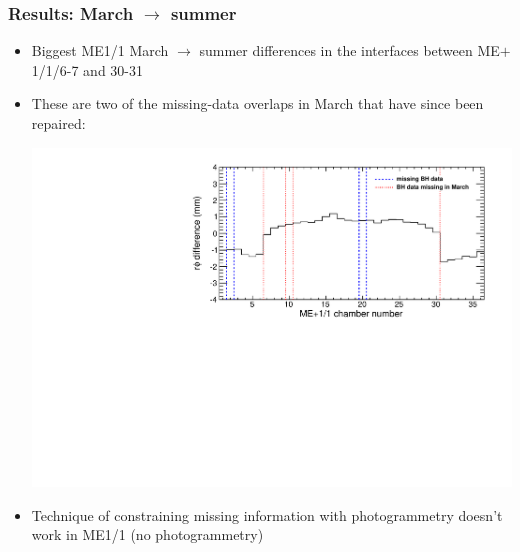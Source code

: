 \documentclass[compress]{beamer}
\begin{document}
\begin{frame}
\frametitle{Results: March $\to$ summer}

\begin{itemize}
\item Biggest ME1/1 March $\to$ summer differences in the interfaces between ME$+$1/1/6-7 and 30-31
\item These are two of the missing-data overlaps in March that have since been repaired:

\includegraphics[width=\linewidth]{TCTtoCollisions_mep11.pdf}

\item Technique of constraining missing information with
  photogrammetry doesn't work in ME1/1 (no photogrammetry)
\end{itemize}
\end{frame}
\end{document}
